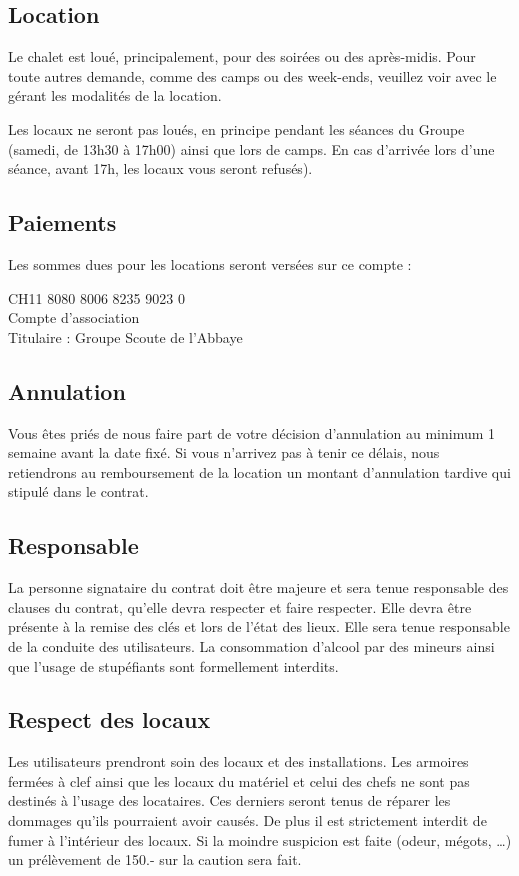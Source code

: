 \documentclass[a4paper,12pt]{extarticle}
\begin{document}
\subsection{Location}

Le chalet est loué, principalement, pour des soirées ou des après-midis.
Pour toute autres demande, comme des camps ou des week-ends, veuillez voir avec le gérant les modalités de la location.

{\color{red} Les locaux ne seront pas loués, en principe pendant les séances du Groupe (samedi, de 13h30 à 17h00) ainsi que lors de camps. En cas d'arrivée lors d'une séance, avant 17h, les locaux vous seront refusés). }

\subsection{Paiements}
Les sommes dues pour les locations seront versées sur ce compte :

CH11 8080 8006 8235 9023 0 \\
Compte d'association \\
Titulaire : Groupe Scoute de l'Abbaye \\

\subsection{Annulation}

Vous êtes priés de nous faire part de votre décision d'annulation au minimum 1 semaine avant la date fixé.
Si vous n'arrivez pas à tenir ce délais, nous retiendrons au remboursement de la location un montant d'annulation tardive qui stipulé dans le contrat.

\subsection{Responsable}
La personne signataire du contrat doit être majeure et sera tenue responsable des clauses du contrat, qu'elle devra respecter et faire respecter.
Elle devra être présente à la remise des clés et lors de l'état des lieux. Elle sera tenue responsable de la conduite des utilisateurs.
La consommation d'alcool par des mineurs ainsi que l'usage de stupéfiants sont formellement interdits.

\subsection{Respect des locaux}
Les utilisateurs prendront soin des locaux et des installations.
Les armoires fermées à clef ainsi que les locaux du matériel et celui des chefs ne sont pas destinés à l'usage des locataires.
Ces derniers seront tenus de réparer les dommages qu'ils pourraient avoir causés.
De plus {\color{red} il est strictement interdit de fumer à l'intérieur des locaux.}
Si la moindre suspicion est faite (odeur, mégots, …) un prélèvement de 150.- sur la caution sera fait.
\end{document}
